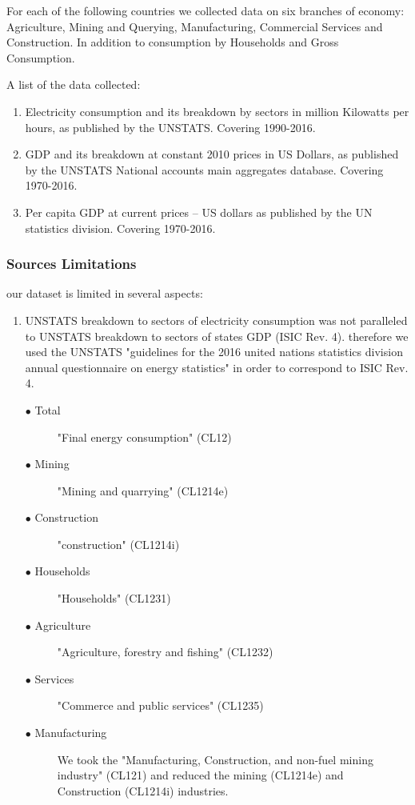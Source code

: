 \documentclass[]{amsart}
\begin{document}
\begin{appendices}
For each of the following countries we collected data on six branches of economy: Agriculture, Mining and Querying, Manufacturing, Commercial
Services and Construction. In addition to consumption by Households and Gross Consumption.

A list of the data collected:

\begin{enumerate}
  \item Electricity consumption and its breakdown by sectors in million Kilowatts per hours, as published by the UNSTATS. Covering 1990-2016.
  \item GDP and its breakdown at constant 2010 prices in US Dollars, as published by the UNSTATS National accounts main aggregates database. Covering 1970-2016.
  \item Per capita GDP at current prices – US dollars as published by the UN statistics division. Covering 1970-2016.
\end{enumerate}
		\subsubsection{Sources Limitations}
		our dataset is limited in several aspects:
		 \begin{enumerate}
  \item UNSTATS breakdown to sectors of electricity consumption was not paralleled to UNSTATS breakdown to sectors of states GDP (ISIC Rev. 4). therefore we used the UNSTATS "guidelines for the 2016 united nations statistics division annual questionnaire on energy statistics" in order to correspond to ISIC Rev. 4.
  \begin{description}
  \item[$\bullet$ Total] "Final energy consumption" (CL12)
  \item[$\bullet$ Mining] "Mining and quarrying" (CL1214e)
  \item[$\bullet$ Construction] "construction" (CL1214i)
  \item[$\bullet$ Households] "Households" (CL1231)
  \item[$\bullet$ Agriculture] "Agriculture, forestry and fishing" (CL1232)
  \item[$\bullet$ Services] "Commerce and public services" (CL1235)
  \item[$\bullet$ Manufacturing] We took the "Manufacturing, Construction, and non-fuel mining industry" (CL121) and reduced the mining (CL1214e) and Construction (CL1214i) industries. 
  

\end{description}
\end{enumerate}
\end{appendices}
\end{document}
